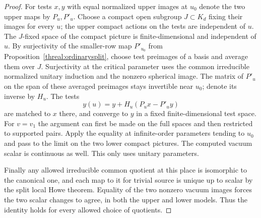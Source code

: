 \begin{proof}
For tests \(x,y\) with equal normalized upper images at \(u_0\)
denote the two upper maps by \(P_u,P'_u\). Choose a compact open
subgroup \(J\subset K_d\) fixing their images for every \(u\);
the upper compact actions on the tests are independent of \(u\).
The \(J\)-fixed space of the compact picture is finite-dimensional
and independent of \(u\). By surjectivity of the smaller-row map
\(P'_{u_0}\) from Proposition~\ref{threal:ordinarysplit}, choose
test preimages of a basis and average them over \(J\).
Surjectivity at the critical parameter uses the common irreducible
normalized unitary induction and the nonzero spherical image.
The matrix of \(P'_u\) on the span of these averaged preimages
stays invertible near \(u_0\); denote its inverse by \(H_u\).
The tests
\[
             y(u)=y+H_u(P_u x-P'_u y)
\]
are matched to \(x\) there, and converge to \(y\) in a fixed
finite-dimensional test space. For \(v=v_1\) the argument can
first be made on the full spaces and then restricted to supported
pairs. Apply the equality at infinite-order parameters tending
to \(u_0\) and pass to the limit on the two lower compact pictures.
The computed vacuum scalar is continuous as well. This only uses
unitary parameters.

Finally any allowed irreducible common quotient at this place is
isomorphic to the canonical one, and each map to it for trivial
source is unique up to scalar by the split local Howe theorem.
\cite[Theorem~1 and Corollary~6.3]{minguezHowe}
Equality of the two nonzero vacuum images forces the two scalar
changes to agree, in both the upper and lower models. Thus the
identity holds for every allowed choice of quotients.
\end{proof}

